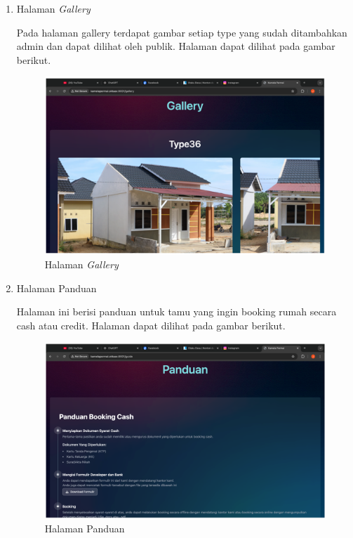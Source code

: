\begin{enumerate}
    \item Halaman \textit{Gallery}
    \par Pada halaman gallery terdapat gambar setiap type yang sudah ditambahkan admin dan dapat dilihat oleh publik. Halaman dapat dilihat pada gambar berikut.
    \begin{figure}
        \centering
        \includegraphics[width=0.75\linewidth]{Implementasi/Gallery.png}
        \caption{Halaman \textit{Gallery}}
    \end{figure}
    
    \item Halaman Panduan
    \par Halaman ini berisi panduan untuk tamu yang ingin booking rumah secara cash atau credit. Halaman dapat dilihat pada gambar berikut.
    \begin{figure}
        \centering
        \includegraphics[width=0.75\linewidth]{Implementasi/Panduan.png}
        \caption{Halaman Panduan}
    \end{figure}
    

\end{enumerate}

